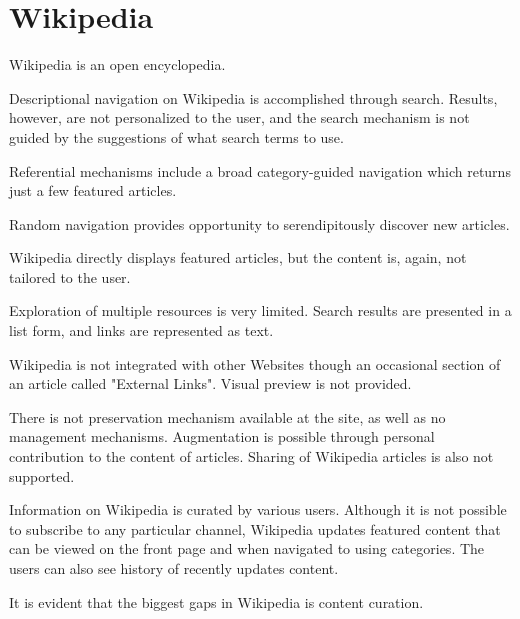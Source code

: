 {\section{Wikipedia}
Wikipedia is an open encyclopedia.

Descriptional navigation on Wikipedia is accomplished through search. Results, however, are not personalized to the user, and the search mechanism is not guided by the suggestions of what search terms to use.

Referential mechanisms include a broad category-guided navigation which returns just a few featured articles.

Random navigation provides opportunity to serendipitously discover new articles. 

Wikipedia directly displays featured articles, but the content is, again, not tailored to the user. 

Exploration of multiple resources is very limited. Search results are presented in a list form, and links are represented as text. 

Wikipedia is not integrated with other Websites though an occasional section of an article called "External Links". Visual preview is not provided.

There is not preservation mechanism available at the site, as well as no management mechanisms. Augmentation is possible through personal contribution to the content of articles.  Sharing of Wikipedia articles is also not supported. 

Information on Wikipedia is curated by various users. Although it is not possible to subscribe to any particular channel, Wikipedia updates featured content that can be viewed on the front page and when navigated to using categories. The users can also see history of recently updates content. 

It is evident that the biggest gaps in Wikipedia is content curation. 

} %


